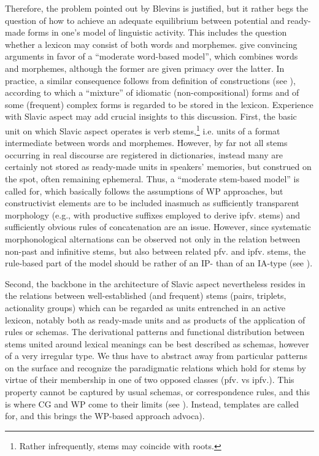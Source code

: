 \documentclass[output=paper]{langscibook}
\begin{document}
Therefore, the problem pointed out by Blevins is justified, but it rather begs the question of how to achieve an adequate equilibrium between potential and ready-made forms in one’s model of linguistic activity. This includes the question whether a lexicon may consist of both words and morphemes. \citet[70--74]{HaspelmathSims2010} give convincing arguments in favor of a ``moderate word-based model'', which combines words and morphemes, although the former are given primacy over the latter. In practice, a similar consequence follows from  definition of constructions (see ), according to which a “mixture” of idiomatic (non-compositional) forms and of some (frequent) complex forms is regarded to be stored in the lexicon. Experience with Slavic aspect may add crucial insights to this discussion. First, the basic unit on which Slavic aspect operates is verb stems,\footnote{Rather infrequently, stems may coincide with roots.} i.e. units of a format intermediate between words and morphemes. However, by far not all stems occurring in real discourse are registered in dictionaries, instead many are certainly not stored as ready-made units in speakers’ memories, but construed on the spot, often remaining ephemeral. Thus, a ``moderate stem-based model'' is called for, which basically follows the assumptions of WP approaches, but constructivist elements are to be included inasmuch as sufficiently transparent morphology (e.g., with productive suffixes employed to derive ipfv. stems) and sufficiently obvious rules of concatenation are an issue. However, since systematic morphonological alternations can be observed not only in the relation between non-past and infinitive stems, but also between related pfv. and ipfv. stems, the rule-based part of the model should be rather of an IP- than of an IA-type (see ).

Second, the backbone in the architecture of Slavic aspect nevertheless resides in the relations between well-established (and frequent) stems (pairs, triplets, actionality groups) which can be regarded as units entrenched in an active lexicon, notably both as ready-made units and as products of the application of rules or schemas. The derivational patterns and functional distribution between stems united around lexical meanings can be best described as schemas, however of a very irregular type. We thus have to abstract away from particular patterns on the surface and recognize the paradigmatic relations which hold for stems by virtue of their membership in one of two opposed classes (pfv. vs ipfv.). This property cannot be captured by usual schemas, or correspondence rules, and this is where CG and WP come to their limits (see ). Instead, templates are called for, and this brings the WP-based approach advoca).
\end{document}

